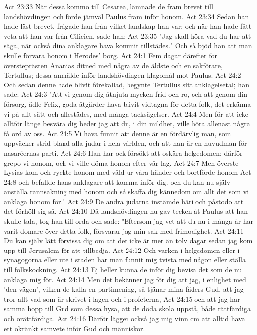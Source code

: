 Act 23:33  När dessa kommo till Cesarea, lämnade de fram brevet till landshövdingen och förde jämväl Paulus fram inför honom.
Act 23:34  Sedan han hade läst brevet, frågade han från vilket landskap han var; och när han hade fått veta att han var från Cilicien, sade han:
Act 23:35  "Jag skall höra vad du har att säga, när också dina anklagare hava kommit tillstädes." Och så bjöd han att man skulle förvara honom i Herodes' borg.
Act 24:1  Fem dagar därefter for översteprästen Ananias ditned med några av de äldste och en sakförare, Tertullus; dessa anmälde inför landshövdingen klagomål mot Paulus.
Act 24:2  Och sedan denne hade blivit förekallad, begynte Tertullus sitt anklagelsetal; han sade:
Act 24:3  "Att vi genom dig åtnjuta mycken frid och ro, och att genom din försorg, ädle Felix, goda åtgärder hava blivit vidtagna för detta folk, det erkänna vi på allt sätt och allestädes, med många tacksägelser.
Act 24:4  Men för att icke alltför länge besvära dig beder jag att du, i din mildhet, ville höra allenast några få ord av oss.
Act 24:5  Vi hava funnit att denne är en fördärvlig man, som uppväcker strid bland alla judar i hela världen, och att han är en huvudman för nasaréernas parti.
Act 24:6  Han har ock försökt att oskära helgedomen; därför grepo vi honom, och vi ville döma honom efter vår lag.
Act 24:7  Men överste Lysias kom och ryckte honom med våld ur våra händer och bortförde honom
Act 24:8  och befallde hans anklagare att komma inför dig. och du kan nu själv anställa rannsakning med honom och så skaffa dig kännedom om allt det som vi anklaga honom för."
Act 24:9  De andra judarna instämde häri och påstodo att det förhöll sig så.
Act 24:10  Då landshövdingen nu gav tecken åt Paulus att han skulle tala, tog han till orda och sade: "Eftersom jag vet att du nu i många år har varit domare över detta folk, försvarar jag min sak med frimodighet.
Act 24:11  Du kan själv lätt förvissa dig om att det icke är mer än tolv dagar sedan jag kom upp till Jerusalem för att tillbedja.
Act 24:12  Och varken i helgedomen eller i synagogorna eller ute i staden har man funnit mig tvista med någon eller ställa till folkskockning.
Act 24:13  Ej heller kunna de inför dig bevisa det som de nu anklaga mig för.
Act 24:14  Men det bekänner jag för dig att jag, i enlighet med 'den vägen', vilken de kalla en partimening, så tjänar mina fäders Gud, att jag tror allt vad som är skrivet i lagen och i profeterna,
Act 24:15  och att jag har samma hopp till Gud som dessa hysa, att de döda skola uppstå, både rättfärdiga och orättfärdiga.
Act 24:16  Därför lägger också jag mig vinn om att alltid hava ett okränkt samvete inför Gud och människor.
